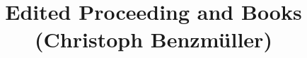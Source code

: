 \documentclass{article}
\begin{document}
\title{Edited Proceeding and Books (Christoph Benzm{\"u}ller)}
\maketitle
\nocite{*}


\end{document}
